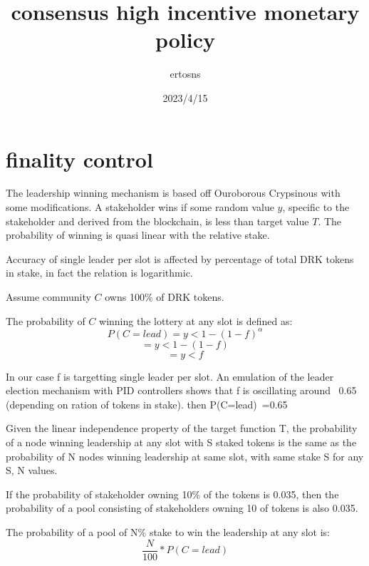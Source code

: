 \documentclass{article}
\begin{document}
\title {consensus high incentive monetary policy}
\author {ertosns}
\date {2023/4/15}
\maketitle


\section{finality control}

\begin{description}
\item The leadership winning mechanism is based off Ouroborous Crypsinous
with some modifications. A stakeholder wins if some random value $y$,
specific to the stakeholder and derived from the blockchain, is less
than target value $T$. The probability of winning is quasi linear with
the relative stake.

\item Accuracy of single leader per slot is affected by percentage of total
DRK tokens in stake, in fact the relation is logarithmic.

\item Assume community $C$ owns 100\% of DRK tokens.

\item The probability of $C$ winning the lottery at any slot is defined as:
  $$P(C=lead) = y < 1 -(1-f)^\alpha $$
  $$= y < 1 -(1-f) $$
  $$= y < f$$

\item In our case f is targetting single leader per slot. An emulation of
the leader election mechanism with PID controllers shows that f is
oscillating around ~0.65 (depending on ration of tokens in stake). then P(C=lead)~=0.65


\item Given the linear independence property of the target function T, the
probability of a node winning leadership at any slot with S staked tokens
is the same as the probability of N nodes winning leadership at same slot,
with same stake S for any S, N values.

\item If the probability of stakeholder owning 10\% of the tokens is 0.035,
then the probability of a pool consisting of stakeholders owning 10%
of tokens is also 0.035.

\item The probability of a pool of N\% stake to win the leadership at any slot is: $$ \frac{N}{100}*P(C=lead)$$




\end{description}
\end{document}

